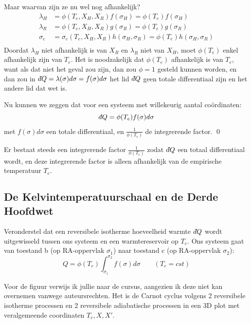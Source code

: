 \begin{derivation}
Maar waarvan zijn ze nu wel nog afhankelijk?
\begin{align*}
    \lambda_H &= \phi(T_e, X_H, X_R) f(\sigma_H) = \phi(T_e)f(\sigma_H) \\
    \lambda_R &= \phi(T_e, X_H, X_R) g(\sigma_R) = \phi(T_e)g(\sigma_R) \\
    \sigma_c &= \sigma_c(T_e, X_H, X_R) h(\sigma_H, \sigma_R) = \phi(T_e)h(\sigma_H, \sigma_R) \\
\end{align*}
Doordat \(\lambda_H\) niet afhankelijk is van \(X_R\) en \(\lambda_R\) niet van \(X_H\), moet \(\phi(T_e)\) enkel afhankelijk zijn van \(T_e\).
Het is noodzakelijk dat \(\phi(T_e)\) afhankelijk is van \(T_e\), want als dat niet het geval zou zijn, dan zou \(\phi = 1\) gesteld kunnen worden, en dan zou in \(\dbar Q = \lambda(\sigma) d\sigma = f(\sigma)d\sigma\) het lid \(\dbar Q\) geen totale differentiaal zijn en het andere lid dat wet is.

Nu kunnen we zeggen dat voor een systeem met willekeurig aantal coördinaten:
\[\dbar Q = \phi(T_e)f(\sigma) d\sigma\]
met \(f(\sigma)d\sigma\) een totale differentiaal, en \(\frac{1}{\phi(T_e)}\) de integrerende factor.
\qed
\end{derivation}

\begin{postulate}
    Er bestaat steeds een integrerende factor \(\frac{1}{\phi(T_e)}\) zodat \(\dbar Q\) een totaal differentiaal wordt, en deze integrerende factor is alleen afhankelijk van de empirische temperatuur \(T_e\).
\end{postulate}

\subsection{De Kelvintemperatuurschaal en de Derde Hoofdwet}

Veronderstel dat een reversibele isotherme hoeveelheid warmte \(\dbar Q\) wordt uitgewisseld tussen ons systeem en een warmtereservoir op \(T_e\).
Ons systeem gaat van toestand b (op RA-oppervlak \(\sigma_1\)) naar toestand c (op RA-oppervlak \(\sigma_2\)):
\[
Q = \phi(T_e) \int_{\sigma_1}^{\sigma_2}f(\sigma)d\sigma  \qquad (T_e = cst)
\]

Voor de figuur verwijs ik jullie naar de cursus, aangezien ik deze niet kan overnemen vanwege auteursrechten.
Het is de Carnot cyclus volgens 2 reversibele isotherme processen en 2 reversibele adiabatische processen in een 3D plot met veralgemeende coordinaten \(T_e, X, X'\).

